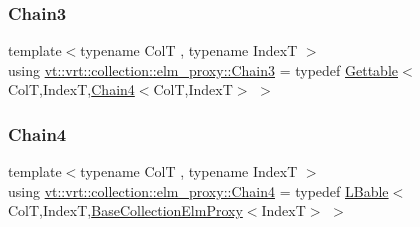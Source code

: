 \subsubsection{\texorpdfstring{Chain3}{Chain3}}
{\footnotesize\ttfamily template$<$typename ColT , typename IndexT $>$ \\
using \hyperlink{namespacevt_1_1vrt_1_1collection_1_1elm__proxy_a8db2caa0e0d4bb8dafc382c8953b2574}{vt\+::vrt\+::collection\+::elm\+\_\+proxy\+::\+Chain3} = typedef \hyperlink{structvt_1_1vrt_1_1collection_1_1_gettable}{Gettable}$<$ColT,IndexT,\hyperlink{namespacevt_1_1vrt_1_1collection_1_1elm__proxy_af0c90ff3494dd7649dfce8048ab2240f}{Chain4}$<$ColT,IndexT$>$ $>$}

\mbox{\label{namespacevt_1_1vrt_1_1collection_1_1elm__proxy_af0c90ff3494dd7649dfce8048ab2240f}} 
\subsubsection{\texorpdfstring{Chain4}{Chain4}}
{\footnotesize\ttfamily template$<$typename ColT , typename IndexT $>$ \\
using \hyperlink{namespacevt_1_1vrt_1_1collection_1_1elm__proxy_af0c90ff3494dd7649dfce8048ab2240f}{vt\+::vrt\+::collection\+::elm\+\_\+proxy\+::\+Chain4} = typedef \hyperlink{structvt_1_1vrt_1_1collection_1_1_l_bable}{L\+Bable}$<$ColT,IndexT,\hyperlink{structvt_1_1vrt_1_1collection_1_1_base_collection_elm_proxy}{Base\+Collection\+Elm\+Proxy}$<$IndexT$>$ $>$}

